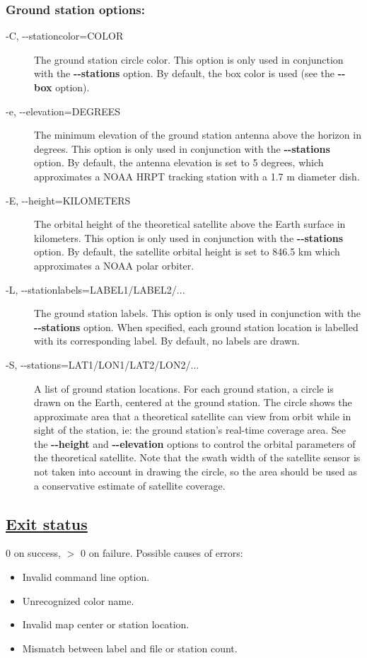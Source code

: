 \subsubsection*{Ground station options:}
\begin{description}
\item[ -C, -{-}stationcolor=COLOR ] The ground station circle color. This option is only used in conjunction with the \textbf{-{-}stations}
 option. By default, the box color is used (see the \textbf{-{-}box}
 option).
\item[ -e, -{-}elevation=DEGREES ] The minimum elevation of the ground station antenna above the horizon in degrees. This option is only used in conjunction with the \textbf{-{-}stations}
 option. By default, the antenna elevation is set to 5 degrees, which approximates a NOAA HRPT tracking station with a 1.7 m diameter dish.
\item[ -E, -{-}height=KILOMETERS ] The orbital height of the theoretical satellite above the Earth surface in kilometers. This option is only used in conjunction with the \textbf{-{-}stations}
 option. By default, the satellite orbital height is set to 846.5 km which approximates a NOAA polar orbiter.
\item[ -L, -{-}stationlabels=LABEL1/LABEL2/... ] The ground station labels. This option is only used in conjunction with the \textbf{-{-}stations}
 option. When specified, each ground station location is labelled with its corresponding label. By default, no labels are drawn.
\item[ -S, -{-}stations=LAT1/LON1/LAT2/LON2/... ] A list of ground station locations. For each ground station, a circle is drawn on the Earth, centered at the ground station. The circle shows the approximate area that a theoretical satellite can view from orbit while in sight of the station, ie: the ground station's real-time coverage area. See the \textbf{-{-}height}
 and \textbf{-{-}elevation}
 options to control the orbital parameters of the theoretical satellite. Note that the swath width of the satellite sensor is not taken into account in drawing the circle, so the area should be used as a conservative estimate of satellite coverage.

\end{description}
\subsection*{\underline{Exit status}}


  0 on success, $>$ 0 on failure. Possible causes of errors:
\begin{itemize}
\item  Invalid command line option. 
\item  Unrecognized color name. 
\item  Invalid map center or station location. 
\item  Mismatch between label and file or station count. 

\end{itemize}
